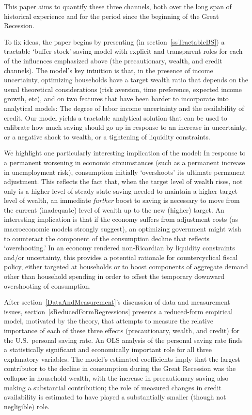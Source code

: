 \documentclass[titlepage]{\econtex}
\begin{document}
This paper aims to quantify these three channels, both over the long
span of historical experience and for the period since the beginning
of the Great Recession.

To fix ideas, the paper begins by presenting (in
section~\ref{ssTractableBS}) a tractable `buffer stock' saving model
with explicit and transparent roles for each of the influences
emphasized above (the precautionary, wealth, and credit channels).
The model's key intuition is that, in the presence of income
uncertainty, optimizing households have a target wealth ratio that
depends on the usual theoretical considerations (risk aversion, time
preference, expected income growth, etc), and on two features
that have been harder to incorporate into analytical models: The degree
of labor income uncertainty and the availability of credit.  Our model
yields a tractable analytical solution that can be used to calibrate
how much saving should go up in response to an increase in
uncertainty, or a negative shock to wealth, or a tightening of
liquidity constraints.

We highlight one particularly interesting implication of the model: In response to a permanent worsening in economic circumstances (such as a permanent increase in unemployment risk), consumption initially `overshoots' its ultimate permanent adjustment.  This reflects the fact that, when the target level of wealth rises, not only is a higher level of steady-state saving needed to maintain a higher target level of wealth, an immediate {\it further} boost to saving is necessary to move from the current (inadequate) level of wealth up to the new (higher) target.  An interesting implication is that if the economy suffers from adjustment costs (as macroeconomic models strongly suggest), an optimizing government might wish to counteract the component of the consumption decline that reflects `overshooting.'  In an economy rendered non-Ricardian by liquidity constraints and/or uncertainty, this provides a potential rationale for countercyclical fiscal policy, either targeted at households or to boost components of aggregate demand other than household spending in order to offset the temporary downward overshooting of consumption.

After section~\ref{DataAndMeasurement}'s discussion of data and measurement issues, section~\ref{sReducedFormRegressions} presents a reduced-form empirical model, motivated by the theory, that attempts to measure the relative importance of each of these three effects (precautionary, wealth, and credit) for the U.S.\ personal saving rate.  An OLS analysis of the personal saving rate finds a statistically significant and economically important role for all three explanatory variables.  The model's estimated coefficients imply that the largest contributor to the decline in consumption during the Great Recession was the collapse in household wealth, with the increase in precautionary saving also making a substantial contribution; the role of measured changes in credit availability is estimated to have played a substantially smaller (though not negligible) role.
\end{document}
